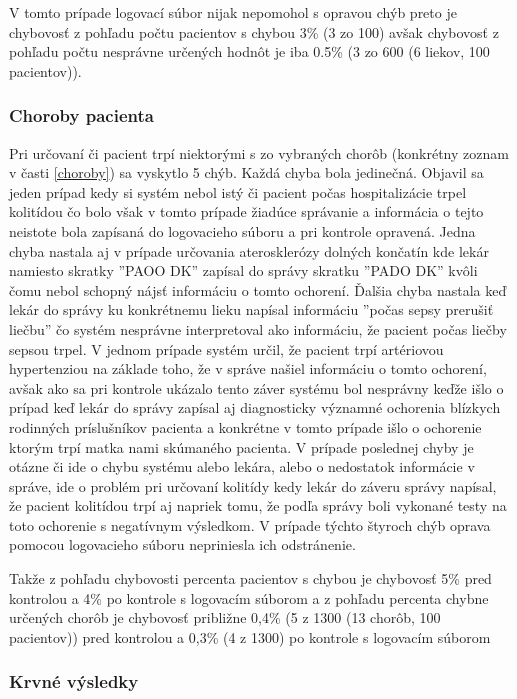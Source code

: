 V tomto prípade logovací súbor nijak nepomohol s opravou chýb preto je chybovosť z pohľadu počtu pacientov s chybou 3\% (3 zo 100) avšak chybovosť z pohľadu počtu nesprávne určených hodnôt je iba 0.5\% (3 zo 600 (6 liekov, 100 pacientov)).

\subsubsection{Choroby pacienta}

Pri určovaní či pacient trpí niektorými s zo vybraných chorôb (konkrétny zoznam v časti \ref{choroby}) sa vyskytlo 5 chýb. Každá chyba bola jedinečná. Objavil sa jeden prípad kedy si systém nebol istý či pacient počas hospitalizácie trpel kolitídou čo bolo však v tomto prípade žiadúce správanie a informácia o tejto neistote bola zapísaná do logovacieho súboru a pri kontrole opravená. Jedna chyba nastala aj v prípade určovania aterosklerózy dolných končatín kde lekár namiesto skratky ''PAOO DK'' zapísal do správy skratku  ''PADO DK'' kvôli čomu nebol schopný nájsť informáciu o tomto ochorení. Ďalšia chyba nastala keď lekár do správy ku konkrétnemu lieku napísal informáciu ''počas sepsy prerušiť liečbu'' čo systém nesprávne interpretoval ako informáciu, že pacient počas liečby sepsou trpel. V jednom prípade systém určil, že pacient trpí artériovou hypertenziou na základe toho, že v správe našiel informáciu o tomto ochorení, avšak ako sa pri kontrole ukázalo tento záver systému bol nesprávny keďže išlo o prípad keď lekár do správy zapísal aj diagnosticky významné ochorenia blízkych rodinných príslušníkov pacienta a konkrétne v tomto prípade išlo o ochorenie ktorým trpí matka nami skúmaného pacienta. V prípade poslednej chyby je otázne či ide o chybu systému alebo lekára, alebo o nedostatok informácie v správe, ide o problém pri určovaní kolitídy kedy lekár do záveru správy napísal, že pacient kolitídou trpí aj napriek tomu, že podľa správy boli vykonané testy na toto ochorenie s negatívnym výsledkom. V prípade týchto štyroch chýb oprava pomocou logovacieho súboru nepriniesla ich odstránenie.

Takže z pohľadu chybovosti percenta pacientov s chybou je chybovosť 5\% pred kontrolou a 4\% po kontrole s logovacím súborom a z pohľadu percenta chybne určených chorôb je chybovosť približne 0,4\% (5 z 1300 (13 chorôb, 100 pacientov)) pred kontrolou a 0,3\% (4 z 1300) po kontrole s logovacím súborom

\subsubsection{Krvné výsledky}

